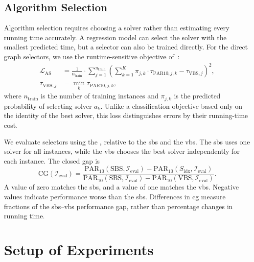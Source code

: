 \subsection{Algorithm Selection}
Algorithm selection requires choosing a solver rather than estimating every running time accurately. A regression model can select the solver with the smallest predicted time, but a selector can also be trained directly. For the direct graph selectors, we use the runtime-sensitive objective of~\citet{ZhaEtAl24b}:
\begin{equation}
\label{eq:ch07:selection-loss}
\begin{aligned}
    \mathcal{L}_{\mathrm{AS}}&=\frac{1}{n_{\mathrm{train}}}\cdot\sum_{j=1}^{n_{\mathrm{train}}}
        \left(\sum_{k=1}^K \pi_{j,k}\cdot \tau_{\mathrm{PAR10},j,k}-\tau_{\mathrm{VBS},j}\right)^2,
    \\
    \tau_{\mathrm{VBS},j}&=\min_k \tau_{\mathrm{PAR10},j,k},
\end{aligned}
\end{equation}
where $n_{\mathrm{train}}$ is the number of training instances and $\pi_{j,k}$ is the predicted probability of selecting solver $a_k$. Unlike a classification objective based only on the identity of the best solver, this loss distinguishes errors by their running-time cost.

We evaluate selectors using the , relative to the \gls{sbs} and the \gls{vbs}. The \gls{sbs} uses one solver for all instances, while the \gls{vbs} chooses the best solver independently for each instance. The closed gap is
\begin{equation}
\label{eq:ch07:closed-gap}
    \mathrm{CG}(\mathcal I_{\mathrm{eval}})=
    \frac{\mathrm{PAR}_{10}(\mathrm{SBS},\mathcal I_{\mathrm{eval}})-\mathrm{PAR}_{10}(S_{\mathrm{idx}},\mathcal I_{\mathrm{eval}})}
         {\mathrm{PAR}_{10}(\mathrm{SBS},\mathcal I_{\mathrm{eval}})-\mathrm{PAR}_{10}(\mathrm{VBS},\mathcal I_{\mathrm{eval}})}.
\end{equation}
A value of zero matches the \gls{sbs}, and a value of one matches the \gls{vbs}. Negative values indicate performance worse than the \gls{sbs}. Differences in \gls{cg} measure fractions of the \gls{sbs}--\gls{vbs} performance gap, rather than percentage changes in running time.

\section{Setup of Experiments}
\label{sec:ch07:ExpSetup}
